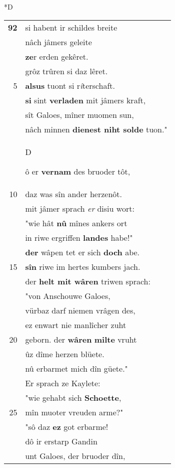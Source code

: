 \documentclass[8pt,a4paper,notitlepage]{article}
\begin{document}
\begin{table}[ht]
\begin{minipage}[t]{0.5\linewidth}
\small
\begin{center}*D
\end{center}
\begin{tabular}{rl}
\textbf{92} & si habent ir schildes breite\\ 
 & nâch jâmers geleite\\ 
 & \textbf{ze}r erden gekêret.\\ 
 & grôz trûren si daz lêret.\\ 
5 & \textbf{alsus} tuont si r\textit{î}terschaft.\\ 
 & \textbf{si} sint \textbf{verladen} mit jâmers kraft,\\ 
 & sît Galoes, mîner muomen sun,\\ 
 & nâch minnen \textbf{dienest niht solde} tuon."\\ 
 & \begin{large}D\end{large}ô er \textbf{vernam} des bruoder tôt,\\ 
10 & daz was sîn ander herzenôt.\\ 
 & mit jâmer sprach \textit{er} disiu wort:\\ 
 & "wie hât \textbf{nû} mînes ankers ort\\ 
 & in riwe ergriffen \textbf{landes} habe!"\\ 
 & \textbf{der} wâpen tet er sich \textbf{doch} abe.\\ 
15 & \textbf{sîn} riwe im hertes kumbers jach.\\ 
 & der \textbf{helt mit wâren} triwen sprach:\\ 
 & "von Anschouwe Galoes,\\ 
 & vürbaz darf niemen vrâgen des,\\ 
 & ez enwart nie manlîcher zuht\\ 
20 & geborn. der \textbf{wâren} \textbf{milte} vruht\\ 
 & ûz dîme herzen blüete.\\ 
 & nû erbarmet mich dîn güete."\\ 
 & Er sprach ze Kaylete:\\ 
 & "wie gehabt sich \textbf{Schoette},\\ 
25 & mîn muoter vreuden arme?"\\ 
 & "sô daz \textbf{ez} got erbarme!\\ 
 & dô ir erstarp Gandin\\ 
 & unt Galoes, der bruoder dîn,\\ 

\end{tabular}
\end{minipage}
\end{table}
\end{document}
